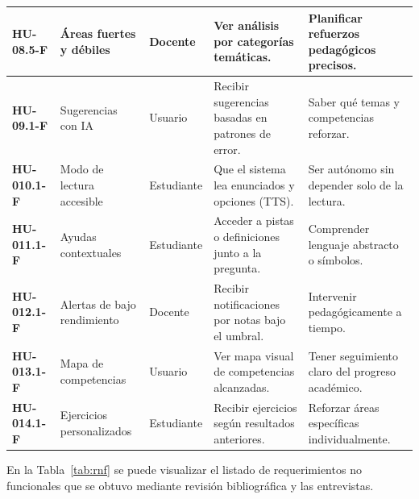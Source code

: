 \begin{small}
\begin{longtable}{|>{\bfseries}p{2.0cm}|p{2.5cm}|p{1.7cm}|p{3.7cm}|p{3.5cm}|}
HU-08.5-F & Áreas fuertes y débiles & Docente & Ver análisis por categorías temáticas. & Planificar refuerzos pedagógicos precisos. \\\hline
HU-09.1-F & Sugerencias con IA & Usuario & Recibir sugerencias basadas en patrones de error. & Saber qué temas y competencias reforzar. \\\hline
HU-010.1-F & Modo de lectura accesible & Estudiante & Que el sistema lea enunciados y opciones (TTS). & Ser autónomo sin depender solo de la lectura. \\\hline
HU-011.1-F & Ayudas contextuales & Estudiante & Acceder a pistas o definiciones junto a la pregunta. & Comprender lenguaje abstracto o símbolos. \\\hline
HU-012.1-F & Alertas de bajo rendimiento & Docente & Recibir notificaciones por notas bajo el umbral. & Intervenir pedagógicamente a tiempo. \\\hline
HU-013.1-F & Mapa de competencias & Usuario & Ver mapa visual de competencias alcanzadas. & Tener seguimiento claro del progreso académico. \\\hline
HU-014.1-F & Ejercicios personalizados & Estudiante & Recibir ejercicios según resultados anteriores. & Reforzar áreas específicas individualmente. \\\hline
\end{longtable}
\end{small}
\elaboracion

En la Tabla~\ref{tab:rnf} se puede visualizar el listado de requerimientos no funcionales que se obtuvo mediante revisión bibliográfica y las entrevistas.

